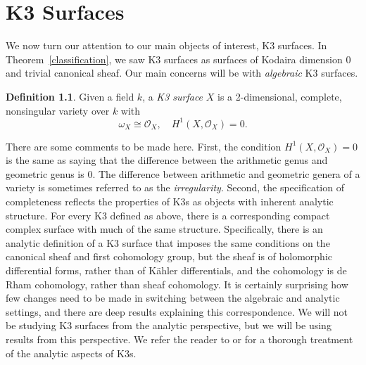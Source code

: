 \documentclass[12pt,twoside]{reedthesis}
\theoremstyle{plain}
\theoremstyle{definition}
\newtheorem{definition}{Definition}[section]
\theoremstyle{remark}
\newcommand{\calO}{\mathcal{O}}
\begin{document}
\chapter{K3 Surfaces}
We now turn our attention to our main objects of interest, K3 surfaces. In Theorem~\ref{classification}, we saw K3 surfaces as surfaces of Kodaira dimension 0 and trivial canonical sheaf. Our main concerns will be with \emph{algebraic} K3 surfaces.
\begin{definition}
Given a field $k$, a \emph{K3 surface} $X$ is a 2-dimensional, complete, nonsingular variety over $k$ with \[\omega_X\cong\calO_X,\quad H^1(X,\calO_X)=0.\]
\end{definition}
\noindent There are some comments to be made here. First, the condition $H^1(X,\calO_X)=0$ is the same as saying that the difference between the arithmetic genus and geometric genus is 0. The difference between arithmetic and geometric genera of a variety is sometimes referred to as the \emph{irregularity}. Second, the specification of completeness reflects the properties of K3s as objects with inherent analytic structure. For every K3 defined as above, there is a corresponding compact complex surface with much of the same structure. Specifically, there is an analytic definition of a K3 surface that imposes the same conditions on the canonical sheaf and first cohomology group, but the sheaf is of holomorphic differential forms, rather than of K\"ahler differentials, and the cohomology is de Rham cohomology, rather than sheaf cohomology. It is certainly surprising how few changes need to be made in switching between the algebraic and analytic settings, and there are deep results explaining this correspondence. We will not be studying K3 surfaces from the analytic perspective, but we will be using results from this perspective. We refer the reader to \cite{huybrechts} or \cite{vanDeVen} for a thorough treatment of the analytic aspects of K3s.
\end{document}
